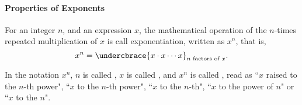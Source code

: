 
\paragraph*{Properties of Exponents}
For an integer $n$, and an expression $x$, the mathematical operation of the $n$-times repeated multiplication of $x$  is call exponentiation, written as $x^n$, that is,
	\[
		x^n=\undercbrace{x\cdot x \cdots x}_{n \text{~factors of~}x}.
	\]

	
	In the notation $x^n$, $n$ is called , $x$ is called , and $x^n$ is called , read as ``$x$ raised to the $n$-th power",  ``$x$ to the $n$-th power", ``$x$ to the $n$-th", ``$x$ to the power of $n$" or ``$x$ to the $n$".

